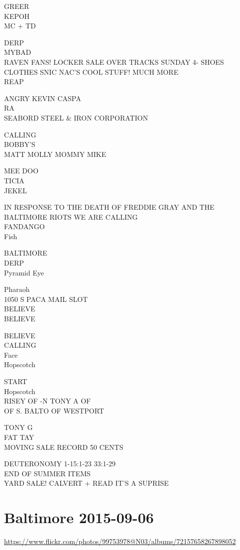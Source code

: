 \documentclass[10pt,letterpaper]{article}
\begin{document}
GREER\\
KEPOH\\
MC + TD

DERP\\
MYBAD\\
RAVEN FANS!  LOCKER SALE OVER TRACKS SUNDAY 4{-} SHOES CLOTHES SNIC NAC'S COOL STUFF!  MUCH MORE\\
REAP

ANGRY KEVIN CASPA\\
RA\\
SEABORD STEEL \& IRON CORPORATION

CALLING\\
BOBBY'S\\
MATT MOLLY MOMMY MIKE

MEE DOO\\
TICIA\\
JEKEL

IN RESPONSE TO THE DEATH OF FREDDIE GRAY AND THE BALTIMORE RIOTS WE ARE CALLING\\
FANDANGO\\
Fish

BALTIMORE\\
DERP\\
Pyramid Eye

Pharaoh\\
1050 S PACA MAIL SLOT\\
BELIEVE\\
BELIEVE

BELIEVE\\
CALLING\\
Face\\
Hopscotch

START\\
Hopscotch\\
RISEY OF {-}N TONY A OF\\
OF S. BALTO OF WESTPORT

TONY G\\
FAT TAY\\
MOVING SALE RECORD 50 CENTS

DEUTERONOMY 1{-}15:1{-}23 33:1{-}29\\
END OF SUMMER ITEMS\\
YARD SALE! CALVERT + READ IT'S A SUPRISE
\

\section*{Baltimore 2015-09-06}

\url{https://www.flickr.com/photos/99753978@N03/albums/72157658267898052}
\end{document}
